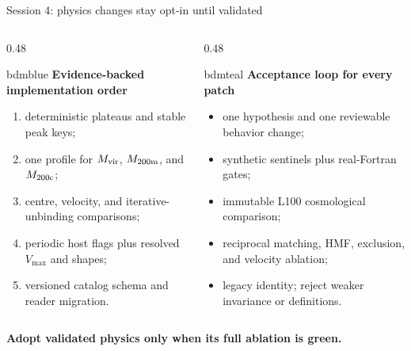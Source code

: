 \documentclass[UTF8]{beamer}
\begin{document}
\begin{frame}{Session 4: physics changes stay opt-in until validated}
  \begin{columns}[T,totalwidth=\textwidth]
    \begin{column}{0.48\textwidth}
      \begin{phasebox}[top=0.9mm,bottom=0.9mm]{bdmblue}
        {\color{bdmblue}\bfseries Evidence-backed implementation order}\par\smallskip
        \scriptsize
        \begin{enumerate}\setlength\itemsep{0em}
          \item deterministic plateaus and stable peak keys;
          \item one profile for $M_{\rm vir}$, $M_{200\rm m}$, and $M_{200\rm c}$;
          \item centre, velocity, and iterative-unbinding comparisons;
          \item periodic host flags plus resolved $V_{\max}$ and shapes;
          \item versioned catalog schema and reader migration.
        \end{enumerate}
      \end{phasebox}
    \end{column}
    \hfill
    \begin{column}{0.48\textwidth}
      \begin{phasebox}[top=0.9mm,bottom=0.9mm]{bdmteal}
        {\color{bdmteal}\bfseries Acceptance loop for every patch}\par\smallskip
        \scriptsize
        \begin{itemize}\setlength\itemsep{0em}
          \item one hypothesis and one reviewable behavior change;
          \item synthetic sentinels plus real-Fortran gates;
          \item immutable L100 cosmological comparison;
          \item reciprocal matching, HMF, exclusion, and velocity ablation;
          \item legacy identity; reject weaker invariance or definitions.
        \end{itemize}
      \end{phasebox}
    \end{column}
  \end{columns}

  \vspace{-0.3ex}
  \centering\textbf{Adopt validated physics only when its full ablation is green.}
\end{frame}
\end{document}
